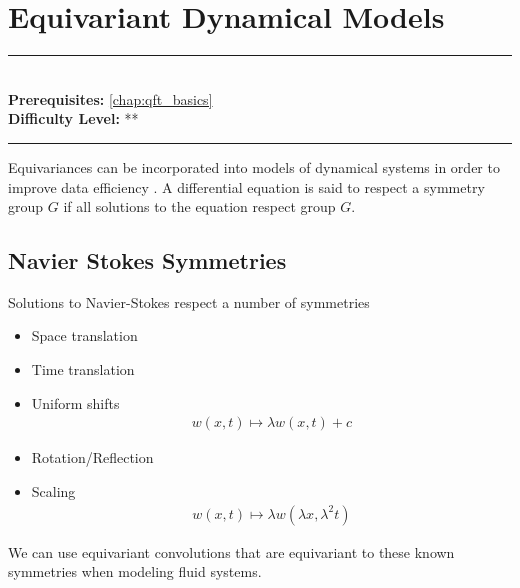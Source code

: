 \documentclass[book.tex]{subfiles}
\begin{document}
\chapter{Equivariant Dynamical Models}

\label{chap:eqdynamic}
\noindent\rule{11cm}{0.4pt} \\
\textbf{Prerequisites:} \autoref{chap:qft_basics}  \\
\textbf{Difficulty Level:} ** \\
\noindent\rule{11cm}{0.4pt}
\vspace{5mm}

Equivariances can be incorporated into models of dynamical systems in order to improve data efficiency \cite{wang2020incorporating}. A differential equation is said to respect a symmetry group $G$ if all solutions to the equation respect group $G$.

\section{Navier Stokes Symmetries}

Solutions to Navier-Stokes respect a number of symmetries
\begin{itemize}
\item Space translation
\item Time translation
\item Uniform shifts
\begin{align}
w(x, t) \mapsto \lambda w(x, t) + c
\end{align}
\item Rotation/Reflection
\item Scaling
\begin{align}
w(x, t) \mapsto \lambda w(\lambda x, \lambda^2 t)
\end{align}
\end{itemize}

We can use equivariant convolutions that are equivariant to these known symmetries when modeling fluid systems. 
\end{document}
